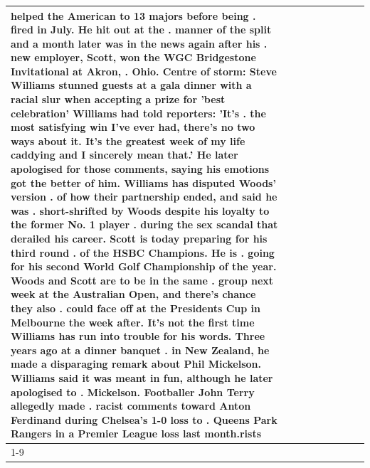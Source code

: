 \begin{table}[H]
\begin{tabular}{lllrlllll}
helped the American to 13 majors before being . fired in July. He hit out at the . manner of the split and a month later was in the news again after his . new employer, Scott, won the WGC Bridgestone Invitational at Akron, . Ohio. Centre of storm: Steve Williams stunned guests at a gala dinner with a racial slur when accepting a prize for 'best celebration' Williams had told reporters: 'It's . the most satisfying win I've ever had, there's no two ways about it. It's the greatest week of my life caddying and I sincerely mean that.' He later apologised for those comments, saying his emotions got the better of him. Williams has disputed Woods' version . of how their partnership ended, and said he was . short-shrifted by Woods despite his loyalty to the former No. 1 player . during the sex scandal that derailed his career. Scott is today preparing for his third round . of the HSBC Champions. He is . going for his second World Golf Championship of the year. Woods and Scott are to be in the same . group next week at the Australian Open, and there's chance they also . could face off at the Presidents Cup in Melbourne the week after. It's not the first time Williams has run into trouble for his words. Three years ago at a dinner banquet . in New Zealand, he made a disparaging remark about Phil Mickelson. Williams said it was meant in fun, although he later apologised to . Mickelson. Footballer John Terry allegedly made . racist comments toward Anton Ferdinand during Chelsea's 1-0 loss to . Queens Park Rangers in a Premier League loss last month.rists \\
\cline{1-9}

\end{tabular}
\end{table}
